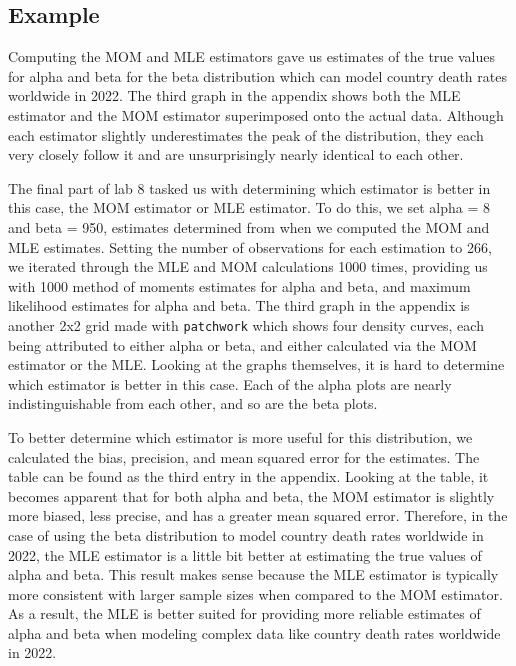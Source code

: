 \documentclass{article}\usepackage[]{graphicx}\usepackage[]{xcolor}
\begin{document}
\begin{multicols}{2}
\section{Example}
Computing the MOM and MLE estimators gave us estimates of the true values for alpha and beta for the beta distribution which can model country death rates worldwide in 2022. The third graph in the appendix shows both the MLE estimator and the MOM estimator superimposed onto the actual data. Although each estimator slightly underestimates the peak of the distribution, they each very closely follow it and are unsurprisingly nearly identical to each other. 

\indent
The final part of lab 8 tasked us with determining which estimator is better in this case, the MOM estimator or MLE estimator. To do this, we set alpha = 8 and beta = 950, estimates determined from when we computed the MOM and MLE estimates. Setting the number of observations for each estimation to 266, we iterated through the MLE and MOM calculations 1000 times, providing us with 1000 method of moments estimates for alpha and beta, and maximum likelihood estimates for alpha and beta. The third graph in the appendix is another 2x2 grid made with \texttt{patchwork} which shows four density curves, each being attributed to either alpha or beta, and either calculated via the MOM estimator or the MLE. Looking at the graphs themselves, it is hard to determine which estimator is better in this case. Each of the alpha plots are nearly indistinguishable from each other, and so are the beta plots.

\indent
To better determine which estimator is more useful for this distribution, we calculated the bias, precision, and mean squared error
for the estimates. The table can be found as the third entry in the appendix. Looking at the table, it becomes apparent that for both alpha and beta, the MOM estimator is slightly more biased, less precise, and has a greater mean squared error. Therefore, in the case of using the beta distribution to model country death rates worldwide in 2022, the MLE estimator is a little bit better at estimating the true values of alpha and beta. This result makes sense because the MLE estimator is typically more consistent with larger sample sizes when compared to the MOM estimator. As a result, the MLE is better suited for providing more reliable estimates of alpha and beta when modeling complex data like country death rates worldwide in 2022.



\vspace{2em}
\nocite{tidyverse}
\nocite{patchwork}
\nocite{cumstats}

\begin{tiny}

\end{tiny}
\end{multicols}
\end{document}
